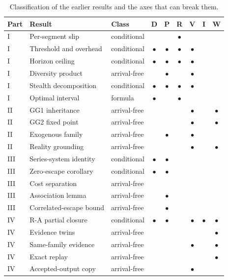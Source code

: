 \documentclass[11pt]{article}
\theoremstyle{definition}
\theoremstyle{remark}
\begin{document}
\begin{table}[!ht]\centering\small
\caption{Classification of the earlier results and the axes that can break them.}\label{tab:matrix}
\begin{tabular}{lllcccccc}
\toprule Part & Result & Class & D & P & R & V & I & W\\\midrule
I & Per-segment slip & conditional &  &  & $\bullet$ &  &  & \\
I & Threshold and overhead & conditional & $\bullet$ & $\bullet$ & $\bullet$ & $\bullet$ &  & \\
I & Horizon ceiling & conditional & $\bullet$ & $\bullet$ & $\bullet$ & $\bullet$ &  & \\
I & Diversity product & arrival-free &  & $\bullet$ &  & $\bullet$ &  & \\
I & Stealth decomposition & conditional & $\bullet$ & $\bullet$ & $\bullet$ & $\bullet$ &  & \\
I & Optimal interval & formula & $\bullet$ &  & $\bullet$ &  &  & \\
II & GG1 inheritance & arrival-free &  &  &  & $\bullet$ &  & $\bullet$\\
II & GG2 fixed point & arrival-free &  &  &  & $\bullet$ &  & $\bullet$\\
II & Exogenous family & arrival-free &  & $\bullet$ &  & $\bullet$ &  & \\
II & Reality grounding & arrival-free &  &  &  & $\bullet$ &  & $\bullet$\\
III & Series-system identity & conditional & $\bullet$ & $\bullet$ &  &  &  & \\
III & Zero-escape corollary & conditional & $\bullet$ & $\bullet$ &  &  &  & \\
III & Cost separation & arrival-free &  &  &  &  &  & \\
III & Association lemma & arrival-free &  & $\bullet$ &  &  &  & \\
III & Correlated-escape bound & arrival-free &  & $\bullet$ &  &  &  & \\
IV & R-A partial closure & conditional & $\bullet$ & $\bullet$ &  & $\bullet$ & $\bullet$ & $\bullet$\\
IV & Evidence twins & arrival-free &  &  &  &  &  & $\bullet$\\
IV & Same-family evidence & arrival-free &  &  &  & $\bullet$ &  & $\bullet$\\
IV & Exact replay & arrival-free &  &  &  &  &  & $\bullet$\\
IV & Accepted-output copy & arrival-free &  &  &  & $\bullet$ &  & \\

\end{tabular}
\end{table}
\end{document}
